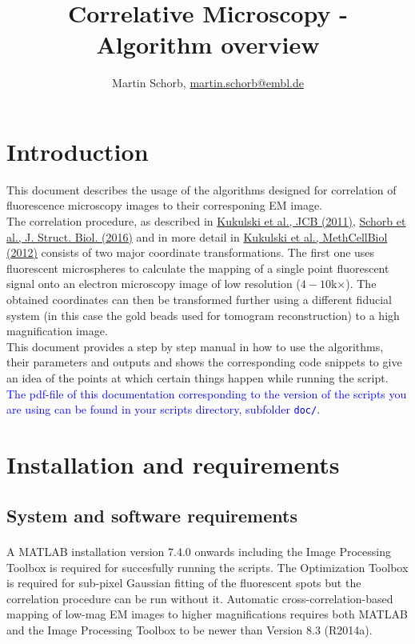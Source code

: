 \documentclass[10pt,a4paper,onepage,DIV12]{scrartcl}
\title{Correlative Microscopy - Algorithm overview}
\author{Martin Schorb, \href{mailto:martin.schorb@embl.de}{martin.schorb@embl.de}}
\begin{document}
\maketitle
\tableofcontents
 \newpage
\section{Introduction}
This document describes the usage of the algorithms designed for correlation of fluorescence microscopy images to their corresponing EM image.\\

The correlation procedure, as described in \href{http://dx.doi.org/10.1083/jcb.201009037}{Kukulski et al., JCB (2011)}, \href{}{Schorb et al., J. Struct. Biol. (2016)} and in more detail in \href{http://dx.doi.org/10.1016/B978-0-12-416026-2.00013-3}{Kukulski et al., MethCellBiol (2012)} consists of two major coordinate transformations. The first one uses fluorescent microspheres to calculate the mapping of a single point fluorescent signal onto an electron microscopy image of low resolution ($4-10 $k$\times$). The obtained coordinates can then be transformed further using a different fiducial system (in this case the gold beads used for tomogram reconstruction) to a high magnification image.\\

This document provides a step by step manual in how to use the algorithms, their parameters and outputs and shows the corresponding code snippets to give an idea of the points at which certain things happen while running the script.\\

\textcolor{blue}{The pdf-file of this documentation corresponding to the version of the scripts you are using can be found in your scripts directory, subfolder \texttt{doc/}.}
\section{Installation and requirements}

\subsection{System and software requirements}A MATLAB\textsuperscript{\textregistered} 
installation version 7.4.0 onwards including the Image Processing Toolbox is required for succesfully running the scripts. The Optimization Toolbox is required for sub-pixel Gaussian fitting of the fluorescent spots but the correlation procedure can be run without it. Automatic cross-correlation-based mapping of low-mag EM images to higher magnifications requires both MATLAB and the Image Processing Toolbox to be newer than Version 8.3 (R2014a).
\end{document}
